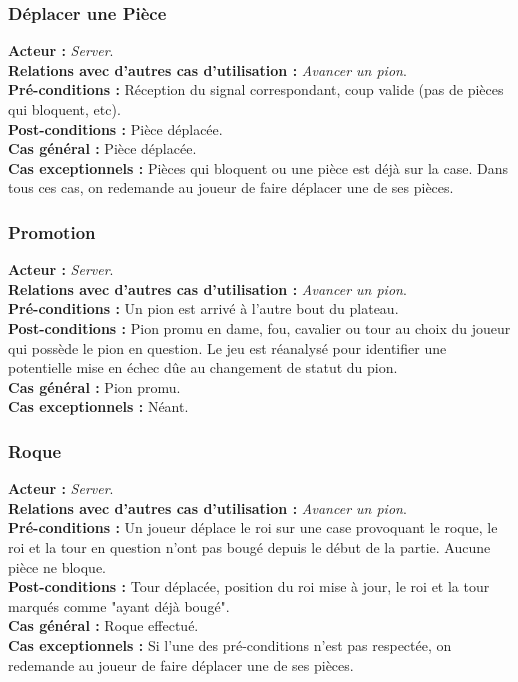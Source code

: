 \documentclass[10pt, a4paper]{article}
\begin{document}
\subsubsection{Déplacer une Pièce}
\textbf{Acteur :} \textit{Server}. \\
\textbf{Relations avec d'autres cas d'utilisation :} {\itshape Avancer un pion}. \\
\textbf{Pré-conditions :} Réception du signal correspondant, coup valide (pas de pièces qui bloquent, etc). \\
\textbf{Post-conditions :} Pièce déplacée. \\
\textbf{Cas général :} Pièce déplacée. \\
\textbf{Cas exceptionnels :} Pièces qui bloquent ou une pièce est déjà sur la case. Dans tous ces cas, on redemande au joueur de faire déplacer une de ses pièces. \\

\subsubsection{Promotion}
\textbf{Acteur :} \textit{Server}. \\
\textbf{Relations avec d'autres cas d'utilisation :} {\itshape Avancer un pion}. \\
\textbf{Pré-conditions :} Un pion est arrivé à l'autre bout du plateau. \\
\textbf{Post-conditions :} Pion promu en dame, fou, cavalier ou tour au choix du joueur qui possède le pion en question. Le jeu est réanalysé pour identifier une potentielle mise en échec dûe au changement de statut du pion. \\
\textbf{Cas général :} Pion promu. \\
\textbf{Cas exceptionnels :} Néant. \\

\subsubsection{Roque}
\textbf{Acteur :} \textit{Server}. \\
\textbf{Relations avec d'autres cas d'utilisation :} {\itshape Avancer un pion}. \\
\textbf{Pré-conditions :} Un joueur déplace le roi sur une case provoquant le roque, le roi et la tour en question n'ont pas bougé depuis le début de la partie. Aucune pièce ne bloque. \\
\textbf{Post-conditions :} Tour déplacée, position du roi mise à jour, le roi et la tour marqués comme "ayant déjà bougé". \\
\textbf{Cas général :} Roque effectué. \\
\textbf{Cas exceptionnels :} Si l'une des pré-conditions n'est pas respectée, on redemande au joueur de faire déplacer une de ses pièces. \\
\end{document}
